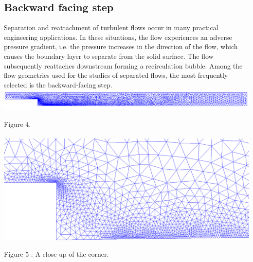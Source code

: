 \documentclass[11pt]{article}
\begin{document}
{%
\subsection{Backward facing step}
Separation and reattachment of turbulent flows occur in many practical engineering 
applications. In these situations, the flow experiences an adverse pressure gradient, 
i.e. the pressure increases in the direction of the flow, which causes the boundary 
layer to separate from the solid surface. The flow subsequently reattaches downstream 
forming a recirculation bubble. Among the flow geometries used for the studies of 
separated flows, the most frequently selected is the backward-facing step.\cite{13}\\

\includegraphics[scale=0.3]{figures/dolfin_plot_2.png}

\vspace{-3mm}\hspace{60mm}Figure 4.\\\\

\hspace{15mm}\includegraphics[scale=0.20]{figures/dolfin_plot_3.png}

\vspace{-1mm}\hspace{50mm}Figure 5 : \scriptsize{A close up of the corner.}\\\\



\newpage
\appendix

}
\end{document}
